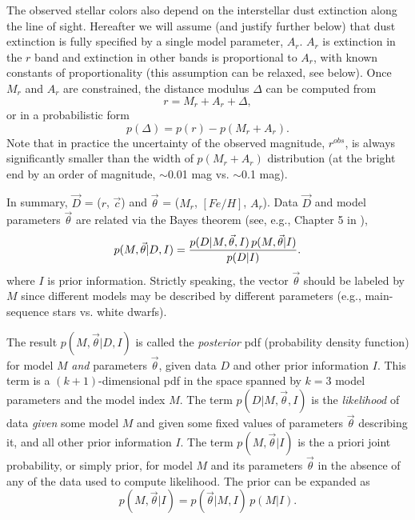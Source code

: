 The observed stellar colors also depend on the interstellar dust extinction along the line of sight. Hereafter
we will assume (and justify further below) that dust extinction is fully specified by a single model parameter, $A_r$.
$A_r$ is extinction in the $r$ band and extinction in other bands is proportional to $A_r$, with known constants
of proportionality (this assumption can be relaxed, see below). Once $M_r$ and $A_r$ are constrained, the distance
modulus $\Delta$ can be computed from
\begin{equation}
  \label{eq:distmod}
                   r = M_r + A_r + \Delta,
\end{equation}
or in a probabilistic form
\begin{equation}
  \label{eq:distmodpdf}
                       p(\Delta) = p(r) - p(M_r + A_r). 
\end{equation}
Note that in practice the uncertainty of the observed magnitude, $r^{obs}$, is always significantly smaller than
the width of $p(M_r + A_r)$ distribution (at the bright end by an order of magnitude, $\sim$0.01 mag vs. $\sim$0.1 mag).

In summary, $\vec{D}$ = ($r$, $\vec{c}$) and $\vec{\theta}$ = ($M_r$, $[Fe/H]$, $A_r$).
Data $\vec{D}$ and model parameters $\vec{\theta}$ are related via the Bayes theorem (see, e.g., Chapter 5 in \citealt{2020sdmm.book.....I}),
\begin{equation}
  \label{eq:BayesFull}
         p(M,\vec{\theta}|D,I) = {  p(D|M,\vec{\theta},I) \, p(M,\vec{\theta}|I) \over p(D|I)}.
\end{equation}
where $I$ is prior information. Strictly speaking, the vector $\vec{\theta}$
should be labeled by $M$ since different models may be described by different parameters (e.g., main-sequence
stars vs. white dwarfs).  

The result $p(M,\vec{\theta}|D,I)$ is called the {\it posterior} pdf (probability density function) for model $M$ {\it and}
parameters $\vec{\theta}$, given data $D$ and other prior information $I$. This term is a $(k+1)$-dimensional
pdf in the space spanned by $k=3$ model parameters and the model index $M$. The term $p(D|M,\vec{\theta},I)$
is the {\it likelihood} of data {\it given} some model $M$ and given some fixed values of
parameters $\vec{\theta}$ describing it, and all other prior information $I$. The term $p(M,\vec{\theta}|I)$
is the a priori joint probability, or simply prior, for model $M$ and its parameters $\vec{\theta}$ in the absence of any
of the data used to compute likelihood. The prior can be expanded as
\begin{equation}
 \label{eq:BayesPriorExpand}
        p(M,\vec{\theta}|I) = p(\vec{\theta}|M,I) \,p(M|I).
\end{equation}

